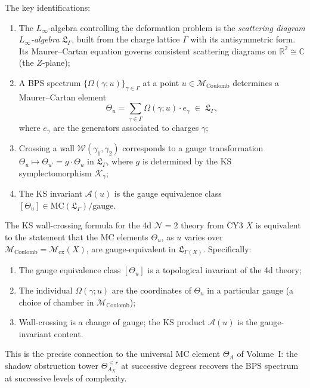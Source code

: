 \begin{construction}
\label{constr:phys-mc-wall-crossing}
The key identifications:
\begin{enumerate}[label=(\roman*)]
\item The $L_\infty$-algebra controlling the deformation problem is the
 \emph{scattering diagram $L_\infty$-algebra} $\mathfrak{L}_\Gamma$, built
 from the charge lattice $\Gamma$ with its antisymmetric form. Its
 Maurer--Cartan equation governs consistent scattering diagrams on
 $\mathbb{R}^2 \cong \mathbb{C}$ (the $Z$-plane);
\item A BPS spectrum $\{\Omega(\gamma; u)\}_{\gamma \in \Gamma}$ at a point
 $u \in \mathcal{M}_{\mathrm{Coulomb}}$ determines a Maurer--Cartan element
 \[
 \Theta_u = \sum_{\gamma \in \Gamma} \Omega(\gamma; u)\cdot e_\gamma
 \;\in\; \mathfrak{L}_\Gamma,
 \]
 where $e_\gamma$ are the generators associated to charges $\gamma$;
\item Crossing a wall $\mathcal{W}(\gamma_1, \gamma_2)$ corresponds to a
 gauge transformation $\Theta_u \mapsto \Theta_{u'} = g\cdot\Theta_u$ in
 $\mathfrak{L}_\Gamma$, where $g$ is determined by the KS symplectomorphism
 $\mathcal{K}_\gamma$;
\item The KS invariant $\mathcal{A}(u)$ is the gauge equivalence class
 $[\Theta_u] \in \mathrm{MC}(\mathfrak{L}_\Gamma)/\mathrm{gauge}$.
\end{enumerate}
\end{construction}

\begin{conjecture}[Wall-crossing = shadow tower gauge equivalence]
\label{prop:phys-wc-shadow}
\ClaimStatusConjectured
The KS wall-crossing formula for the 4d $\mathcal{N}=2$ theory from CY3 $X$ is
equivalent to the statement that the MC elements $\Theta_u$, as $u$ varies over
$\mathcal{M}_{\mathrm{Coulomb}} = \mathcal{M}_{\mathrm{cx}}(X)$, are
gauge-equivalent in $\mathfrak{L}_{\Gamma(X)}$. Specifically:
\begin{enumerate}[label=(\roman*)]
\item The gauge equivalence class $[\Theta_u]$ is a topological invariant of
 the 4d theory;
\item The individual $\Omega(\gamma; u)$ are the coordinates of $\Theta_u$ in
 a particular gauge (a choice of chamber in $\mathcal{M}_{\mathrm{Coulomb}}$);
\item Wall-crossing is a change of gauge; the KS product $\mathcal{A}(u)$ is
 the gauge-invariant content.
\end{enumerate}
This is the precise connection to the universal MC element $\Theta_A$ of
Volume~I: the shadow obstruction tower $\Theta_{A_X}^{\leq r}$ at successive
degrees recovers the BPS spectrum at successive levels of complexity.
\end{conjecture}

